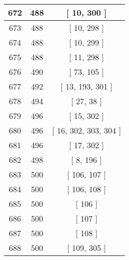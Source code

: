 \begin{center}
\begin{longtable}[H]{|| c c c ||}
\hline
672 & 488 & [ 10, 300 ] \\ 
\hline
673 & 488 & [ 10, 298 ] \\ 
\hline
674 & 488 & [ 10, 299 ] \\ 
\hline
675 & 488 & [ 11, 298 ] \\ 
\hline
676 & 490 & [ 73, 105 ] \\ 
\hline
677 & 492 & [ 13, 193, 301 ] \\ 
\hline
678 & 494 & [ 27, 38 ] \\ 
\hline
679 & 496 & [ 15, 302 ] \\ 
\hline
680 & 496 & [ 16, 302, 303, 304 ] \\ 
\hline
681 & 496 & [ 17, 302 ] \\ 
\hline
682 & 498 & [ 8, 196 ] \\ 
\hline
683 & 500 & [ 106, 107 ] \\ 
\hline
684 & 500 & [ 106, 108 ] \\ 
\hline
685 & 500 & [ 106 ] \\ 
\hline
686 & 500 & [ 107 ] \\ 
\hline
687 & 500 & [ 108 ] \\ 
\hline
688 & 500 & [ 109, 305 ] \\ 
\hline
\end{longtable}
\end{center}
